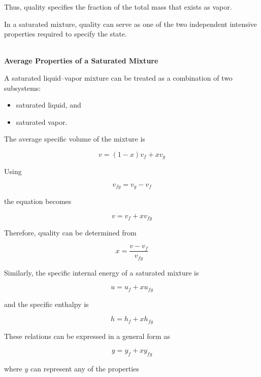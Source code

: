 \documentclass[12pt]{article}
\begin{document}
Thus, quality specifies the fraction of the total mass that exists as vapor.

In a saturated mixture, quality can serve as one of the two independent intensive properties required to specify the state.

\textbf{\\ Average Properties of a Saturated Mixture}

A saturated liquid--vapor mixture can be treated as a combination of two subsystems:
\begin{itemize}
    \item saturated liquid, and
    \item saturated vapor.
\end{itemize}

The average specific volume of the mixture is

\begin{equation*}
v=(1-x)v_f+xv_g
\end{equation*}

Using

\begin{equation*}
v_{fg}=v_g-v_f
\end{equation*}

the equation becomes

\begin{equation*}
\boxed{v=v_f+xv_{fg}}
\end{equation*}

Therefore, quality can be determined from

\begin{equation*}
\boxed{x=\frac{v-v_f}{v_{fg}}}
\end{equation*}

Similarly, the specific internal energy of a saturated mixture is

\begin{equation*}
\boxed{u=u_f+xu_{fg}}
\end{equation*}

and the specific enthalpy is

\begin{equation*}
\boxed{h=h_f+xh_{fg}}
\end{equation*}

These relations can be expressed in a general form as

\begin{equation*}
\boxed{y=y_f+xy_{fg}}
\end{equation*}

where $y$ can represent any of the properties
\end{document}
